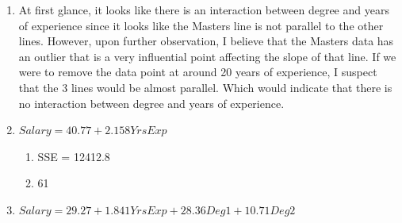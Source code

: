 \documentclass{article}
\providecommand{\tightlist}{%
      \setlength{\itemsep}{0pt}\setlength{\parskip}{0pt}}
\begin{document}
\begin{enumerate}
\def\labelenumi{\alph{enumi})}
\item
  At first glance, it looks like there is an interaction between degree
  and years of experience since it looks like the Masters line is not
  parallel to the other lines. However, upon further observation, I
  believe that the Masters data has an outlier that is a very
  influential point affecting the slope of that line. If we were to
  remove the data point at around 20 years of experience, I suspect that
  the 3 lines would be almost parallel. Which would indicate that there
  is no interaction between degree and years of experience.
\item
  \(Salary = 40.77 + 2.158 YrsExp\)

  \begin{enumerate}
  \def\labelenumii{\roman{enumii})}
  \tightlist
  \item
    SSE = 12412.8
  \item
    61
  \end{enumerate}
\item
  \(Salary = 29.27 + 1.841 YrsExp + 28.36 Deg1 + 10.71 Deg2\)


\end{enumerate}
\end{document}
